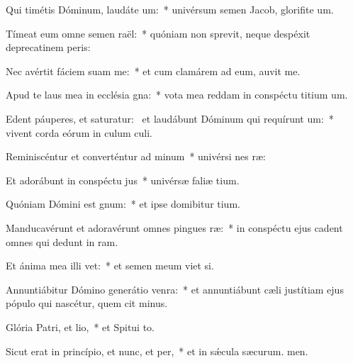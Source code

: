 \item Qui timétis Dóminum, laudáte um:~* univérsum semen Jacob, glorifite um.
\item Tímeat eum omne semen raël:~* quóniam non sprevit, neque despéxit deprecatinem peris:
\item Nec avértit fáciem suam  me:~* et cum clamárem ad eum, auvit me.
\item Apud te laus mea in ecclésia gna:~* vota mea reddam in conspéctu titium um.
\item Edent páuperes, et saturatur:~\pscross{} et laudábunt Dóminum qui requírunt um:~* vivent corda eórum in culum culi.
\item Reminiscéntur et converténtur ad minum~* univérsi nes ræ:
\item Et adorábunt in conspéctu jus~* univérsæ faliæ tium.
\item Quóniam Dómini est gnum:~* et ipse domibitur tium.
\item Manducavérunt et adoravérunt omnes pingues ræ:~* in conspéctu ejus cadent omnes qui dedunt in ram.
\item Et ánima mea illi vet:~* et semen meum viet si.
\item Annuntiábitur Dómino generátio venra:~* et annuntiábunt cæli justítiam ejus pópulo qui nascétur, quem cit minus.
\item Glória Patri, et lio,~* et Spitui to.
\item Sicut erat in princípio, et nunc, et per,~* et in sǽcula sæcurum. men.
